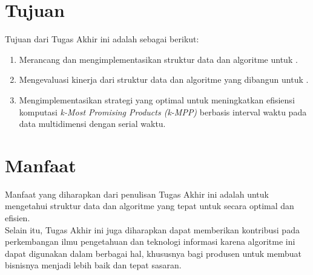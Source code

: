 \section{Tujuan}
\tab Tujuan dari Tugas Akhir ini adalah sebagai berikut:

\begin{enumerate}
	\item Merancang dan mengimplementasikan struktur data dan algoritme untuk \problem.
	\item Mengevaluasi kinerja dari struktur data dan algoritme yang dibangun untuk \problem.
	\item Mengimplementasikan strategi yang optimal untuk meningkatkan efisiensi komputasi \textit{k-Most Promising Products (k-MPP)} berbasis interval waktu pada data multidimensi dengan serial waktu.
\end{enumerate}

\section{Manfaat}
\tab Manfaat yang diharapkan dari penulisan Tugas Akhir ini adalah untuk mengetahui struktur data dan algoritme yang tepat untuk \problem secara optimal dan efisien.\\
\tab Selain itu, Tugas Akhir ini juga diharapkan dapat memberikan kontribusi pada perkembangan ilmu pengetahuan dan teknologi informasi karena algoritme ini dapat digunakan dalam berbagai hal, khususnya bagi produsen untuk membuat bisnisnya menjadi lebih baik dan tepat sasaran.

